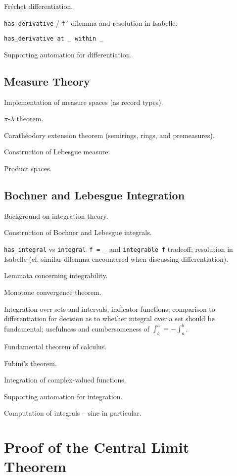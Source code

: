 \documentclass{amsart}
\theoremstyle{definition}
\theoremstyle{remark}
\begin{document}
Fr\'echet differentiation.

\texttt{has\_derivative} / \texttt{f'} dilemma and resolution in Isabelle.

\texttt{has\_derivative at \_ within \_}

Supporting automation for differentiation.

\subsection{Measure Theory}

Implementation of measure spaces (as record types).

$\pi$-$\lambda$ theorem.

Carath\'eodory extension theorem (semirings, rings, and premeasures).

Construction of Lebesgue measure.

Product spaces.

\subsection{Bochner and Lebesgue Integration}

Background on integration theory.

Construction of Bochner and Lebesgue integrals.

\texttt{has\_integral} vs \texttt{integral f = \_} and \texttt{integrable f} tradeoff; resolution in Isabelle (cf. similar dilemma encountered when discussing differentiation).

Lemmata concerning integrability.

Monotone convergence theorem.

Integration over sets and intervals; indicator functions; comparison to differentiation for decision as to whether integral over a set should be fundamental; usefulness and cumbersomeness of $\int_b^a = - \int_a^b$.

Fundamental theorem of calculus.

Fubini's theorem.

Integration of complex-valued functions.

Supporting automation for integration.

Computation of integrals -- sinc in particular.

\section{Proof of the Central Limit Theorem} \label{Proof}
\end{document}
